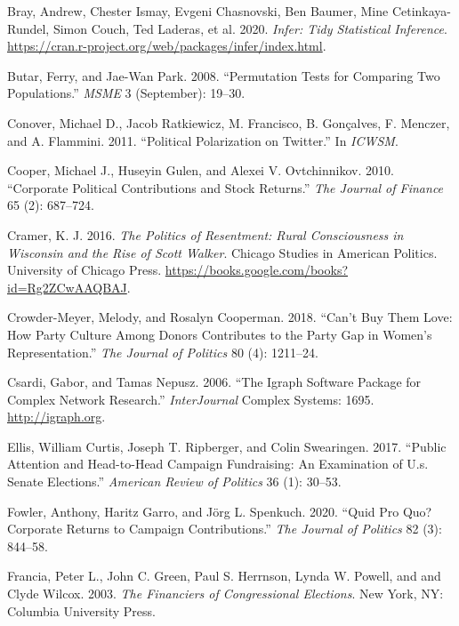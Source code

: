\documentclass[12pt,]{article}
\begin{document}
\leavevmode\hypertarget{ref-infer}{}%
Bray, Andrew, Chester Ismay, Evgeni Chasnovski, Ben Baumer, Mine
Cetinkaya-Rundel, Simon Couch, Ted Laderas, et al. 2020. \emph{Infer:
Tidy Statistical Inference}.
\url{https://cran.r-project.org/web/packages/infer/index.html}.

\leavevmode\hypertarget{ref-butar2008}{}%
Butar, Ferry, and Jae-Wan Park. 2008. ``Permutation Tests for Comparing
Two Populations.'' \emph{MSME} 3 (September): 19--30.

\leavevmode\hypertarget{ref-conover2011}{}%
Conover, Michael D., Jacob Ratkiewicz, M. Francisco, B. Gonçalves, F.
Menczer, and A. Flammini. 2011. ``Political Polarization on Twitter.''
In \emph{ICWSM}.

\leavevmode\hypertarget{ref-cooper2010}{}%
Cooper, Michael J., Huseyin Gulen, and Alexei V. Ovtchinnikov. 2010.
``Corporate Political Contributions and Stock Returns.'' \emph{The
Journal of Finance} 65 (2): 687--724.

\leavevmode\hypertarget{ref-cramer2016}{}%
Cramer, K. J. 2016. \emph{The Politics of Resentment: Rural
Consciousness in Wisconsin and the Rise of Scott Walker}. Chicago
Studies in American Politics. University of Chicago Press.
\url{https://books.google.com/books?id=Rg2ZCwAAQBAJ}.

\leavevmode\hypertarget{ref-crowder-meyer2018}{}%
Crowder-Meyer, Melody, and Rosalyn Cooperman. 2018. ``Can't Buy Them
Love: How Party Culture Among Donors Contributes to the Party Gap in
Women's Representation.'' \emph{The Journal of Politics} 80 (4):
1211--24.

\leavevmode\hypertarget{ref-igraph}{}%
Csardi, Gabor, and Tamas Nepusz. 2006. ``The Igraph Software Package for
Complex Network Research.'' \emph{InterJournal} Complex Systems: 1695.
\url{http://igraph.org}.

\leavevmode\hypertarget{ref-ellis2017}{}%
Ellis, William Curtis, Joseph T. Ripberger, and Colin Swearingen. 2017.
``Public Attention and Head-to-Head Campaign Fundraising: An Examination
of U.s. Senate Elections.'' \emph{American Review of Politics} 36 (1):
30--53.

\leavevmode\hypertarget{ref-garro2020}{}%
Fowler, Anthony, Haritz Garro, and Jörg L. Spenkuch. 2020. ``Quid Pro
Quo? Corporate Returns to Campaign Contributions.'' \emph{The Journal of
Politics} 82 (3): 844--58.

\leavevmode\hypertarget{ref-francia2003}{}%
Francia, Peter L., John C. Green, Paul S. Herrnson, Lynda W. Powell, and
and Clyde Wilcox. 2003. \emph{The Financiers of Congressional
Elections}. New York, NY: Columbia University Press.
\end{document}
